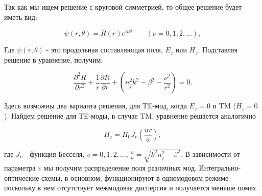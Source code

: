 Так как мы ищем решение с круговой симметрией, то общее решение будет иметь вид:

\begin{equation}
	\psi(r, \theta) = R(r)e^{i\nu\theta} \qquad (\nu = 0,1,2, ...),
\end{equation}

Где $\psi(r, \theta)$ - это продольная составляющая поля, $E_z$ или $H_z$. Подставляя решение в уравнение, получим:

\begin{equation}
	\frac{\partial^2 R}{\partial r^2} + \frac{1}{r}\frac{\partial R}{\partial r}+(n_j^2 k^2 - \beta^2 - \frac{\nu^2}{r^2}) = 0.
\end{equation}

Здесь возможны два варианта решения, для TE-мод, когда $E_z = 0$ и TM ($H_z = 0$). Найдем решение для TE-моды, в случае TM, уравнение решается аналогично

\begin{equation}
	H_z = H_0 J_v (\frac{ur}{a}),
	\label{cylinder_bessel}
\end{equation}

где $J_v$ - функция Бесселя, $v = 0, 1, 2,\ldots$, $\frac{u}{a} = \sqrt{k^2 n_j^2 - \beta^2}$. В зависимости от параметра $v$ мы получим распределение поля различных мод. Интегрально-оптические схемы, в основном, функционируют в одномодовом режиме поскольку в нем отсутствует межмодовая дисперсия и получается меньше помех.